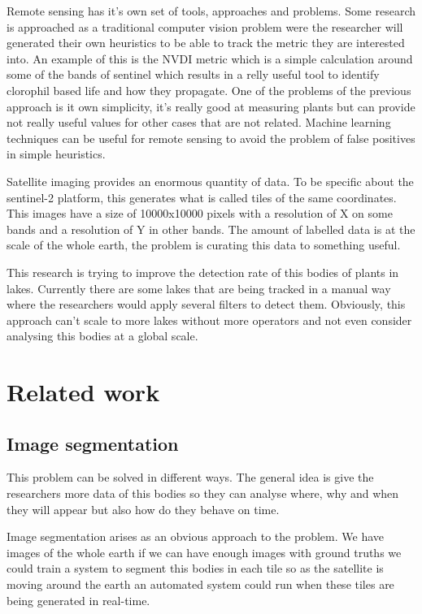 \documentclass[conference]{IEEEtran}
\begin{document}
    Remote sensing has it's own set of tools, approaches and problems.
    Some research is approached as a traditional computer vision problem were the researcher will
    generated their own heuristics to be able to track the metric they are interested into.
    An example of this is the NVDI metric which is a simple calculation around some of the bands of
    sentinel which results in a relly useful tool to identify clorophil based life and how they
    propagate.
    One of the problems of the previous approach is it own simplicity, it's really good at measuring
    plants but can provide not really useful values for other cases that are not related.
    Machine learning techniques can be useful for remote sensing to avoid the problem of false
    positives in simple heuristics.

    Satellite imaging provides an enormous quantity of data.
    To be specific about the sentinel-2 platform, this generates what is called tiles of the same coordinates. This
    images have a size of 10000x10000 pixels with a resolution of X on some bands and a resolution of Y in other bands.
    The amount of labelled data is at the scale of the whole earth, the problem is curating this
    data to something useful.

    This research is trying to improve the detection rate of this bodies of plants in lakes.
    Currently there are some lakes that are being tracked in a manual way where the researchers
    would apply several filters to detect them.
    Obviously, this approach can't scale to more lakes without more operators and not even consider analysing this
    bodies at a global scale.


    \section{Related work}


    \subsection*{Image segmentation}
    This problem can be solved in different ways. The general idea is give the researchers more data
    of this bodies so they can analyse where, why and when they will appear but also how do they
    behave on time.

    Image segmentation arises as an obvious approach to the problem. We have images of the whole earth
    if we can have enough images with ground truths we could train a system to segment this bodies in
    each tile so as the satellite is moving around the earth an automated system could run when these
    tiles are being generated in real-time.
\end{document}

